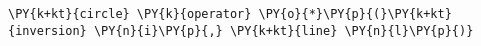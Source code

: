 \begin{Verbatim}[commandchars=\\\{\}]
    \PY{k+kt}{circle} \PY{k}{operator} \PY{o}{*}\PY{p}{(}\PY{k+kt}{inversion} \PY{n}{i}\PY{p}{,} \PY{k+kt}{line} \PY{n}{l}\PY{p}{)}
\end{Verbatim}
